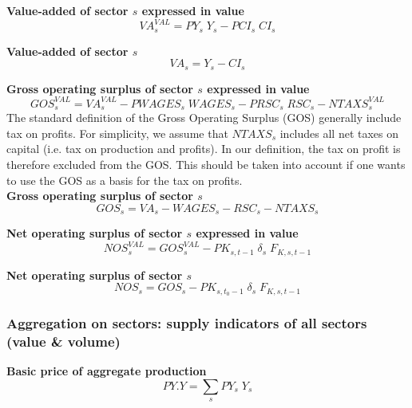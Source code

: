 \documentclass[12pt]{article}
\numberwithin{equation}{section}
\begin{document}
\noindent \textbf{Value-added of sector $s$ expressed in value} 
\begin{dmath}
VA^{VAL}_{s} = PY_{s} \; Y_{s} - PCI_{s} \; CI_{s}
\label{SU.mdlVA_VAL[s]}
\end{dmath}

\noindent \textbf{Value-added of sector $s$} 
\begin{dmath}
VA_{s} = Y_{s} - CI_{s}
\label{SU.mdlVA[s]}
\end{dmath}

\noindent \textbf{Gross operating surplus of sector $s$ expressed in value} 
\begin{dmath}
GOS^{VAL}_{s} = VA^{VAL}_{s} - PWAGES_{s} \; WAGES_{s} - PRSC_{s} \; RSC_{s} - NTAXS^{VAL}_{s}
\label{SU.mdlGOS_VAL[s]}
\end{dmath}
The standard definition of the Gross Operating Surplus (GOS) generally include tax on profits. For simplicity, we assume that $NTAXS_{s}$ includes all net taxes on capital (i.e. tax on production and profits). In our definition, the tax on profit is therefore excluded from the GOS. This should be taken into account if one wants to use the GOS as a basis for the tax on profits. \\

\noindent \textbf{Gross operating surplus of sector $s$} 
\begin{dmath}
GOS_{s} = VA_{s} - WAGES_{s} - RSC_{s} - NTAXS_{s}
\label{SU.mdlGOS[s]}
\end{dmath}

\noindent \textbf{Net operating surplus of sector $s$ expressed in value} 
\begin{dmath}
NOS^{VAL}_{s} = GOS^{VAL}_{s} - PK_{s, t-1} \; \delta_{s} \; F_{K, s, t-1}
\label{SU.mdlNOS_VAL[s]}
\end{dmath}

\noindent \textbf{Net operating surplus of sector $s$} 
\begin{dmath}
NOS_{s} = GOS_{s} - PK_{s, t_{0}-1} \; \delta_{s} \; F_{K, s, t-1}
\label{SU.mdlNOS[s]}
\end{dmath}




\subsubsection{Aggregation on sectors: supply indicators of all sectors  (value \& volume)}



\noindent \textbf{Basic price of aggregate production} 
\begin{dmath}
PY . Y = \sum_{s} PY_{s} \; Y_{s}
\label{SU.mdlPY}
\end{dmath}
\end{document}

